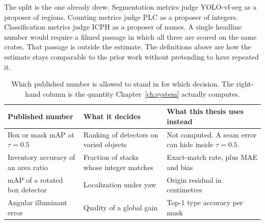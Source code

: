 The split is the one  already drew. Segmentation metrics judge YOLO-vf-seg as a proposer of regions. Counting metrics judge PLC as a proposer of integers. Classification metrics judge ICPH as a proposer of names. A single headline number would require a filmed passage in which all three are scored on the same crates. That passage is outside the estimate. The definitions above are how the estimate stays comparable to the prior work without pretending to have repeated it.

\begin{table}[t]
\centering
\caption{Which published number is allowed to stand in for which decision. The right-hand column is the quantity Chapter~\ref{ch:system} actually computes.}
\label{tab:metrics-map}
\small
\begin{tabular}{@{}p{}p{}p{}@{}}
\toprule
Published number & What it decides & What this thesis uses instead \\
\midrule
Box or mask mAP at $\tau=0.5$~\cite{lin2014coco} & Ranking of detectors on varied objects & Not computed. A seam error can hide inside $\tau=0.5$. \\
Inventory accuracy of an area ratio~\cite{hu2025arbca} & Fraction of stacks whose integer matches & Exact-match rate, plus MAE and bias \\
mAP of a rotated box detector~\cite{wang2025rewyolo} & Localization under yaw & Origin residual in centimetres \\
Angular illuminant error~\cite{barron2017ffcc,hu2017fc4} & Quality of a global gain & Top-1 type accuracy per mask \\
\bottomrule
\end{tabular}
\end{table}
